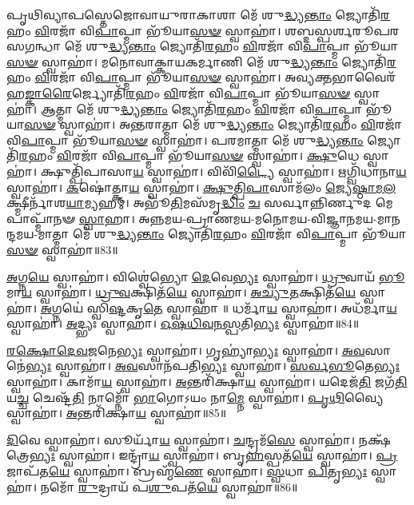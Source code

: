 𑌪𑍃𑌥𑌿𑌵𑍍𑌯𑌾𑌪𑌸𑍍𑌤𑍇𑌜𑍋𑌵𑌾𑌯𑍁𑌰𑌾𑌕𑌾𑌶𑌾 𑌮𑍇᳴ 𑌶𑍁\-\ul{𑌦𑍍𑌧𑍍𑌯}\-\-\ul{𑌨𑍍𑌤𑌾𑌂} 𑌜𑍍𑌯𑍋𑌤𑌿᳴\-\ul{𑌰}\-𑌹𑌂 \ul{𑌵𑌿}\-𑌰𑌜𑌾᳴ 𑌵𑌿\-\ul{𑌪𑌾}\-𑌪𑍍𑌮𑌾 𑌭𑍂᳴𑌯𑌾\-\ul{𑌸}\-\-\ul{𑍟} 𑌸𑍍𑌵𑌾𑌹𑌾॑। 
𑌶𑌬𑍍𑌦𑌸𑍍𑌪𑌰𑍍𑌶𑌰𑍂𑌪𑌰𑌸𑌗𑌨𑍍𑌧𑌾  𑌮𑍇᳴ 𑌶𑍁\-\ul{𑌦𑍍𑌧𑍍𑌯}\-\-\ul{𑌨𑍍𑌤𑌾𑌂} 𑌜𑍍𑌯𑍋𑌤𑌿᳴\-\ul{𑌰}\-𑌹𑌂 \ul{𑌵𑌿}\-𑌰𑌜𑌾᳴ 𑌵𑌿\-\ul{𑌪𑌾}\-𑌪𑍍𑌮𑌾 𑌭𑍂᳴𑌯𑌾\-\ul{𑌸}\-\-\ul{𑍟} 𑌸𑍍𑌵𑌾𑌹𑌾॑। 
𑌮𑌨𑍋𑌵𑌾𑌕𑍍𑌕𑌾𑌯𑌕𑌰𑍍𑌮𑌾𑌣𑌿  𑌮𑍇᳴ 𑌶𑍁\-\ul{𑌦𑍍𑌧𑍍𑌯}\-\-\ul{𑌨𑍍𑌤𑌾𑌂} 𑌜𑍍𑌯𑍋𑌤𑌿᳴\-\ul{𑌰}\-𑌹𑌂 \ul{𑌵𑌿}\-𑌰𑌜𑌾᳴ 𑌵𑌿\-\ul{𑌪𑌾}\-𑌪𑍍𑌮𑌾 𑌭𑍂᳴𑌯𑌾\-\ul{𑌸}\-\-\ul{𑍟} 𑌸𑍍𑌵𑌾𑌹𑌾॑। 
𑌅𑌵𑍍𑌯𑌕𑍍𑌤𑌭𑌾𑌵𑍈𑌰᳴𑌹\-\ul{𑌙𑍍𑌕𑌾}\-\-\ul{𑌰𑍈}\-𑌰𑍍𑌜𑍍𑌯𑍋𑌤𑌿᳴\-\ul{𑌰}\-𑌹𑌂 \ul{𑌵𑌿}\-𑌰𑌜𑌾᳴ 𑌵𑌿\-\ul{𑌪𑌾}\-𑌪𑍍𑌮𑌾 𑌭𑍂᳴𑌯𑌾\-\ul{𑌸}\-\-\ul{𑍟} 𑌸𑍍𑌵𑌾𑌹𑌾॑। 
𑌆𑌤𑍍𑌮𑌾 𑌮𑍇᳴ 𑌶𑍁\-\ul{𑌦𑍍𑌧𑍍𑌯}\-\-\ul{𑌨𑍍𑌤𑌾𑌂} 𑌜𑍍𑌯𑍋𑌤𑌿᳴\-\ul{𑌰}\-𑌹𑌂 \ul{𑌵𑌿}\-𑌰𑌜𑌾᳴ 𑌵𑌿\-\ul{𑌪𑌾}\-𑌪𑍍𑌮𑌾 𑌭𑍂᳴𑌯𑌾\-\ul{𑌸}\-\-\ul{𑍟} 𑌸𑍍𑌵𑌾𑌹𑌾॑। 
𑌅𑌨𑍍𑌤𑌰𑌾𑌤𑍍𑌮𑌾 𑌮𑍇᳴ 𑌶𑍁\-\ul{𑌦𑍍𑌧𑍍𑌯}\-\-\ul{𑌨𑍍𑌤𑌾𑌂} 𑌜𑍍𑌯𑍋𑌤𑌿᳴\-\ul{𑌰}\-𑌹𑌂 \ul{𑌵𑌿}\-𑌰𑌜𑌾᳴ 𑌵𑌿\-\ul{𑌪𑌾}\-𑌪𑍍𑌮𑌾 𑌭𑍂᳴𑌯𑌾\-\ul{𑌸}\-\-\ul{𑍟} 𑌸𑍍𑌵𑌾𑌹𑌾॑। 
𑌪𑌰𑌮𑌾𑌤𑍍𑌮𑌾  𑌮𑍇᳴ 𑌶𑍁\-\ul{𑌦𑍍𑌧𑍍𑌯}\-\-\ul{𑌨𑍍𑌤𑌾𑌂} 𑌜𑍍𑌯𑍋𑌤𑌿᳴\-\ul{𑌰}\-𑌹𑌂 \ul{𑌵𑌿}\-𑌰𑌜𑌾᳴ 𑌵𑌿\-\ul{𑌪𑌾}\-𑌪𑍍𑌮𑌾 𑌭𑍂᳴𑌯𑌾\-\ul{𑌸}\-\-\ul{𑍟} 𑌸𑍍𑌵𑌾𑌹𑌾॑। 
\-\ul{𑌕𑍍𑌷𑍁}\-𑌧𑍇 𑌸𑍍𑌵𑌾𑌹𑌾॑। 
𑌕𑍍𑌷𑍁𑌤𑍍𑌪𑌿᳴𑌪𑌾𑌸𑌾\-\ul{𑌯} 𑌸𑍍𑌵𑌾𑌹𑌾॑। 
𑌵𑌿𑌵𑌿᳴\-\ul{𑌟𑍍𑌯𑍈} 𑌸𑍍𑌵𑌾𑌹𑌾॑। 
𑌋𑌗𑍍𑌵𑌿᳴𑌧𑌾𑌨𑌾\-\ul{𑌯} 𑌸𑍍𑌵𑌾𑌹𑌾॑। 
\-\ul{𑌕}\-𑌷𑍋॑𑌤𑍍𑌕𑌾\-\ul{𑌯} 𑌸𑍍𑌵𑌾𑌹𑌾॑। 
\-\ul{𑌕𑍍𑌷𑍁}\-\-\ul{𑌤𑍍𑌪𑌿}\-\-\ul{𑌪𑌾}\-𑌸𑌾𑌮᳴𑌲𑌂 \ul{𑌜𑍍𑌯𑍇}\-\-\ul{𑌷𑍍𑌠𑌾}\-\-\ul{𑌮}\-\-\ul{𑌲}\-𑌕𑍍𑌷𑍍𑌮𑍀𑌰𑍍𑌨𑌾᳴𑌶\-\ul{𑌯𑌾}\-𑌮𑍍𑌯𑌹𑌮𑍍। 
𑌅𑌭𑍂᳴\-\ul{𑌤𑌿}\-𑌮𑌸᳴𑌮𑍃\-\ul{𑌦𑍍𑌧𑌿𑌂} \ul{𑌚} 𑌸𑌰𑍍𑌵𑌾𑌨𑍍𑌨𑌿𑌰𑍍𑌣𑍁𑌦 𑌮𑍇 𑌪𑌾𑌪𑍍𑌮𑌾᳴𑌨𑍟 \ul{𑌸𑍍𑌵𑌾}\-𑌹𑌾।
𑌅𑌨𑍍𑌨𑌮𑌯-𑌪𑍍𑌰𑌾𑌣𑌮𑌯-𑌮𑌨𑍋𑌮𑌯-𑌵𑌿𑌜𑍍𑌞𑌾𑌨𑌮𑌯-𑌮𑌾𑌨𑌨𑍍𑌦𑌮𑌯-𑌮𑌾𑌤𑍍𑌮𑌾 𑌮𑍇᳴ 𑌶𑍁\-\ul{𑌦𑍍𑌧𑍍𑌯}\-\-\ul{𑌨𑍍𑌤𑌾𑌂} 𑌜𑍍𑌯𑍋𑌤𑌿᳴\-\ul{𑌰}\-𑌹𑌂 \ul{𑌵𑌿}\-𑌰𑌜𑌾᳴ 𑌵𑌿\-\ul{𑌪𑌾}\-𑌪𑍍𑌮𑌾 𑌭𑍂᳴𑌯𑌾\-\ul{𑌸}\-\-\ul{𑍟} 𑌸𑍍𑌵𑌾𑌹𑌾॑॥83॥
\anuvakamend

\-\ul{𑌅}\-𑌗𑍍𑌨\-\ul{𑌯𑍇} 𑌸𑍍𑌵𑌾𑌹𑌾॑। 
𑌵𑌿𑌶𑍍𑌵𑍇॑𑌭𑍍𑌯𑍋 \ul{𑌦𑍇}\-𑌵𑍇\-\ul{𑌭𑍍𑌯𑌃} 𑌸𑍍𑌵𑌾𑌹𑌾॑। 
\-\ul{𑌧𑍍𑌰𑍁}\-𑌵𑌾𑌯᳴ \ul{𑌭𑍂}\-𑌮𑌾\-\ul{𑌯} 𑌸𑍍𑌵𑌾𑌹𑌾॑। 
\-\ul{𑌧𑍍𑌰𑍁}\-\-\ul{𑌵}\-𑌕𑍍𑌷𑌿𑌤᳴\-\ul{𑌯𑍇} 𑌸𑍍𑌵𑌾𑌹𑌾॑। 
\-\ul{𑌅}\-\-\ul{𑌚𑍍𑌯𑍁}\-\-\ul{𑌤}\-𑌕𑍍𑌷𑌿𑌤᳴\-\ul{𑌯𑍇} 𑌸𑍍𑌵𑌾𑌹𑌾॑। 
\-\ul{𑌅}\-𑌗𑍍𑌨𑌯𑍇॑ 𑌸𑍍𑌵𑌿\-\ul{𑌷𑍍𑌟}\-𑌕𑍃\-\ul{𑌤𑍇} 𑌸𑍍𑌵𑌾𑌹𑌾॑ ॥ 
𑌧𑌰𑍍𑌮𑌾᳴\-\ul{𑌯} 𑌸𑍍𑌵𑌾𑌹𑌾॑। 
𑌅𑌧᳴𑌰𑍍𑌮𑌾\-\ul{𑌯} 𑌸𑍍𑌵𑌾𑌹𑌾॑। 
\-\ul{𑌅}\-𑌦𑍍𑌭𑍍𑌯𑌃 𑌸𑍍𑌵𑌾𑌹𑌾॑। 
\-\ul{𑌓}\-\-\ul{𑌷}\-\-\ul{𑌧𑌿}\-\-\ul{𑌵}\-\-\ul{𑌨}\-\-\ul{𑌸𑍍𑌪}\-𑌤𑌿\-\ul{𑌭𑍍𑌯𑌃} 𑌸𑍍𑌵𑌾𑌹𑌾॑॥84॥ 


\-\ul{𑌰}\-\-\ul{𑌕𑍍𑌷𑍋}\-\-\ul{𑌦𑍇}\-\-\ul{𑌵}\-\-\ul{𑌜}\-𑌨𑍇\-\ul{𑌭𑍍𑌯𑌃} 𑌸𑍍𑌵𑌾𑌹𑌾॑। 
𑌗𑍃𑌹𑍍𑌯𑌾॑\-\ul{𑌭𑍍𑌯𑌃} 𑌸𑍍𑌵𑌾𑌹𑌾॑। 
\-\ul{𑌅}\-\-\ul{𑌵}\-𑌸𑌾𑌨𑍇॑\-\ul{𑌭𑍍𑌯𑌃} 𑌸𑍍𑌵𑌾𑌹𑌾॑। 
\-\ul{𑌅}\-\-\ul{𑌵}\-𑌸𑌾𑌨᳴𑌪𑌤𑌿\-\ul{𑌭𑍍𑌯𑌃} 𑌸𑍍𑌵𑌾𑌹𑌾॑। 
\-\ul{𑌸}\-\-\ul{𑌰𑍍𑌵}\-\-\ul{𑌭𑍂}\-𑌤𑍇\-\ul{𑌭𑍍𑌯𑌃} 𑌸𑍍𑌵𑌾𑌹𑌾॑। 
𑌕𑌾𑌮𑌾᳴\-\ul{𑌯} 𑌸𑍍𑌵𑌾𑌹𑌾॑। 
\-\ul{𑌅}\-𑌨𑍍𑌤𑌰𑌿᳴𑌕𑍍𑌷𑌾\-\ul{𑌯} 𑌸𑍍𑌵𑌾𑌹𑌾॑। 
𑌯𑌦𑍇𑌜᳴\-\ul{𑌤𑌿} 𑌜𑌗᳴\-\ul{𑌤𑌿} 𑌯\-\ul{𑌚𑍍𑌚} 𑌚𑍇𑌷𑍍𑌟᳴\-\ul{𑌤𑌿} 𑌨𑌾𑌮𑍍𑌨𑍋᳴ \ul{𑌭𑌾}\-𑌗𑍋𑌽𑌯𑌂 𑌨𑌾\-\ul{𑌮𑍍𑌨𑍇} 𑌸𑍍𑌵𑌾𑌹𑌾॑। 
\-\ul{𑌪𑍃}\-\-\ul{𑌥𑌿}\-𑌵𑍍𑌯𑍈 𑌸𑍍𑌵𑌾𑌹𑌾॑। 
\-\ul{𑌅}\-𑌨𑍍𑌤𑌰𑌿᳴𑌕𑍍𑌷𑌾\-\ul{𑌯} 𑌸𑍍𑌵𑌾𑌹𑌾॑॥85॥ 


\-\ul{𑌦𑌿}\-𑌵𑍇 𑌸𑍍𑌵𑌾𑌹𑌾॑। 
𑌸𑍂𑌰𑍍𑌯𑌾᳴\-\ul{𑌯} 𑌸𑍍𑌵𑌾𑌹𑌾॑। 
\-\ul{𑌚}\-𑌨𑍍𑌦𑍍𑌰𑌮᳴\-\ul{𑌸𑍇} 𑌸𑍍𑌵𑌾𑌹𑌾॑। 
𑌨𑌕𑍍𑌷᳴𑌤𑍍𑌰𑍇\-\ul{𑌭𑍍𑌯𑌃} 𑌸𑍍𑌵𑌾𑌹𑌾॑। 
𑌇𑌨𑍍𑌦𑍍𑌰𑌾᳴\-\ul{𑌯} 𑌸𑍍𑌵𑌾𑌹𑌾॑। 
𑌬𑍃\-\ul{𑌹}\-𑌸𑍍𑌪𑌤᳴\-\ul{𑌯𑍇} 𑌸𑍍𑌵𑌾𑌹𑌾॑। 
\-\ul{𑌪𑍍𑌰}\-𑌜𑌾𑌪᳴𑌤\-\ul{𑌯𑍇} 𑌸𑍍𑌵𑌾𑌹𑌾॑। 
𑌬𑍍𑌰𑌹𑍍𑌮᳴\-\ul{𑌣𑍇} 𑌸𑍍𑌵𑌾𑌹𑌾॑। 
\-\ul{𑌸𑍍𑌵}\-𑌧𑌾 \ul{𑌪𑌿}\-𑌤𑍃\-\ul{𑌭𑍍𑌯𑌃} 𑌸𑍍𑌵𑌾𑌹𑌾॑। 
𑌨𑌮𑍋᳴ \ul{𑌰𑍁}\-𑌦𑍍𑌰𑌾𑌯᳴ 𑌪\-\ul{𑌶𑍁}\-𑌪𑌤᳴\-\ul{𑌯𑍇} 𑌸𑍍𑌵𑌾𑌹𑌾॑॥86॥

